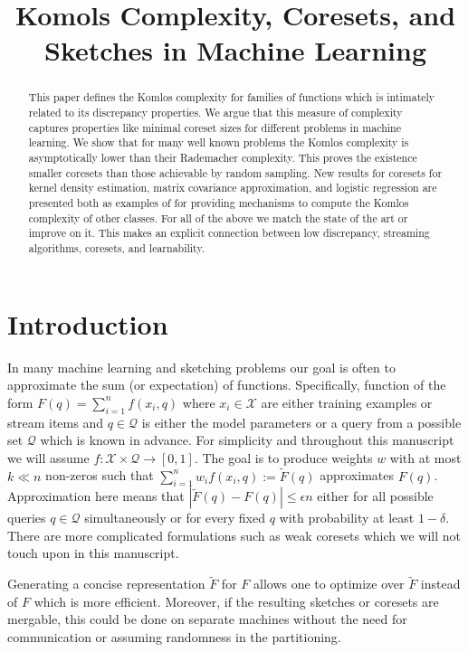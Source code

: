 \documentclass[anon,12pt]{colt2019} %
\title[Komols Complexity, Coresets, and Sketches in Machine Learning]{Komols Complexity, Coresets, and Sketches in Machine Learning}
\newcommand{\eps}{\epsilon}
\newcommand{\X}{\mathcal{X}}
\newcommand{\Q}{\mathcal{Q}}
\begin{document}
\maketitle

\begin{abstract}
This paper defines the Komlos complexity for families of functions which is intimately related to its discrepancy properties.
We argue that this measure of complexity captures properties like minimal coreset sizes for different problems in machine learning. We show that for many well known problems the Komlos complexity is asymptotically lower than their Rademacher complexity. This proves the existence smaller coresets than those achievable by random sampling. 
New results for coresets for kernel density estimation, matrix covariance approximation, and logistic regression are presented both as examples of for providing mechanisms to compute the Komlos complexity of other classes.
For all of the above we match the state of the art or improve on it.
This makes an explicit connection between low discrepancy, streaming algorithms, coresets, and learnability. 
\end{abstract}


\section{Introduction}

In many machine learning and sketching problems our goal is often to approximate the sum (or expectation) of functions.
Specifically, function of the form $F(q) = \sum_{i=1}^{n} f(x_i, q)$ where $x_i \in \mathcal X$ are either training examples or stream items and $q \in \mathcal Q$ is either the model parameters or a query from a possible set $\Q$ which is known in advance. For simplicity and throughout this manuscript we will assume $f:\X\times\Q\rightarrow [0,1]$.
The goal is to produce weights $w$ with at most $k \ll n$ non-zeros such that $\sum_{i=1}^{n}w_i f(x_i,q) := \tilde F(q)$ approximates $F(q)$.
Approximation here means that $|\tilde F(q)  - F(q)| \le \eps n$ either for all possible queries $q \in \mathcal Q$ simultaneously or for every fixed $q$ with probability at least $1-\delta$. 
There are more complicated formulations such as weak coresets which we will not touch upon in this manuscript.

Generating a concise representation $\tilde F$ for $F$ allows one to optimize over $\tilde F$ instead of $F$ which is more efficient. 
Moreover, if the resulting sketches or coresets are mergable, this could be done on separate machines without the need for communication or assuming randomness in the partitioning.
\end{document}
